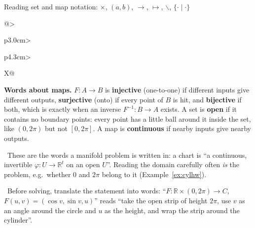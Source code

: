 \documentclass[11pt]{article}
\newcounter{keyfact}
\newcommand{\why}{\par\smallskip{\color{intgreen}\textbf{Why.}}\ }
\newcommand{\sowhat}{\par\smallskip{\color{corpurple}\textbf{So what.}}\ }
\newcommand{\R}{\mathbb{R}}
\begin{document}
\begin{keyfactbox}{Reading set and map notation: $\times$, $(a,b)$, $\to$, $\mapsto$, $\smallsetminus$, $\{\cdot\mid\cdot\}$}
{\begin{xltabular}{\linewidth}{@{}>{\raggedright\arraybackslash}p{3.0cm}>{\raggedright\arraybackslash}p{4.3cm}>{\raggedright\arraybackslash}X@{}}
\bottomrule
\end{xltabular}}
\textbf{Words about maps.} $F:A\to B$ is \textbf{injective} (one-to-one) if different inputs give different outputs,
\textbf{surjective} (onto) if every point of $B$ is hit, and \textbf{bijective} if both, which is exactly when an inverse
$F^{-1}:B\to A$ exists. A set is \textbf{open} if it contains no boundary points: every point has a little ball around it inside
the set, like $(0,2\pi)$ but not $[0,2\pi]$. A map is \textbf{continuous} if nearby inputs give nearby outputs.
\why These are the words a manifold problem is written in: a chart is ``a continuous, invertible $\varphi:U\to\R^t$ on an open
$U$''. Reading the domain carefully often \emph{is} the problem, e.g.\ whether $0$ and $2\pi$ belong to it (Example~\ref{ex:cylhw}).
\sowhat Before solving, translate the statement into words: ``$F:\R\times(0,2\pi)\to C$, $F(u,v)=(\cos v,\sin v,u)$'' reads ``take the open
strip of height $2\pi$, use $v$ as an angle around the circle and $u$ as the height, and wrap the strip around the cylinder''.
\end{keyfactbox}
\end{document}
